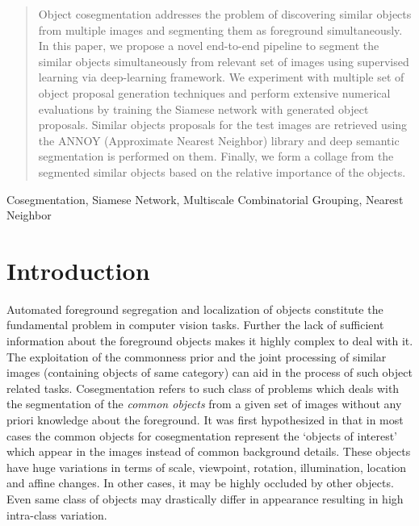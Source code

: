 \documentclass[conference]{IEEEtran}
\begin{document}
\begin{abstract}
Object cosegmentation addresses the problem of discovering similar objects from multiple images and segmenting them as foreground simultaneously. In this paper, we propose a novel end-to-end pipeline to segment the similar objects simultaneously from relevant set of images using supervised learning via deep-learning framework. We experiment with multiple set of object proposal generation techniques and perform extensive numerical evaluations by training the Siamese network with generated object proposals. Similar objects proposals for the test images are retrieved using the ANNOY (Approximate Nearest Neighbor) library and deep semantic segmentation is performed on them. Finally, we form a collage from the segmented similar objects based on the relative importance of the objects. 
\end{abstract}

\begin{IEEEkeywords}
Cosegmentation, Siamese Network, Multiscale Combinatorial Grouping, Nearest Neighbor
\end{IEEEkeywords}

\section{Introduction \label{sec:intro}}
Automated foreground segregation and localization of objects constitute the fundamental problem in computer vision tasks. Further the lack of sufficient information about the foreground objects makes it highly complex to deal with it. The exploitation of the commonness prior and the joint processing of similar images (containing objects of same category) can aid in the process of such object related tasks. Cosegmentation refers to such class of problems which deals with the segmentation of the \textit{common objects} from a given set of images without any priori knowledge about the foreground. It was first hypothesized in \cite{vicente2011object} that in most cases the common objects for cosegmentation represent the `objects of interest' which appear in the images instead of common background details. These objects have huge variations in terms of scale, viewpoint, rotation, illumination, location and affine changes. In other cases, it may be highly occluded by other objects. Even same class of objects may drastically differ in appearance resulting in high intra-class variation. 
\end{document}
